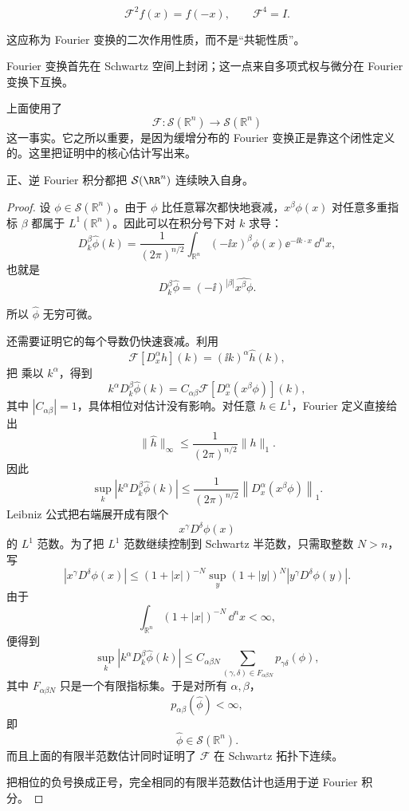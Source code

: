 \[
\mathcal F^2f(x)=f(-x),\qquad \mathcal F^4=I.
\]

这应称为 Fourier 变换的二次作用性质，而不是``共轭性质''。

Fourier 变换首先在 Schwartz 空间上封闭；这一点来自多项式权与微分在 Fourier 变换下互换。

上面使用了
\[
\mathcal F:\mathcal S(\mathbb R^n)\to\mathcal S(\mathbb R^n)
\]
这一事实。它之所以重要，是因为缓增分布的 Fourier 变换正是靠这个闭性定义的。这里把证明中的核心估计写出来。

\begin{proposition}
正、逆 Fourier 积分都把 $\mathcal S(\RR^n)$ 连续映入自身。
\end{proposition}
\begin{proof}
设 $\phi\in\mathcal S(\mathbb R^n)$。由于 $\phi$ 比任意幂次都快地衰减，$x^\beta\phi(x)$ 对任意多重指标 $\beta$ 都属于 $L^1(\mathbb R^n)$。因此可以在积分号下对 $k$ 求导：
\[
D_k^\beta\widehat\phi(k)
=\frac1{(2\pi)^{n/2}}
\int_{\mathbb R^n}(-\ii x)^\beta
\phi(x)\ee^{-\ii k\cdot x}\,\dd^n x,
\]
也就是
\begin{equation}
D_k^\beta\widehat\phi
=(-\ii)^{|\beta|}\widehat{x^\beta\phi}.
\label{eq:schwartz-fourier-derivative}
\end{equation}



所以 $\widehat\phi$ 无穷可微。

还需要证明它的每个导数仍快速衰减。利用
\[
\mathcal F[D_x^\alpha h](k)
=(\ii k)^\alpha\widehat h(k),
\]
把  乘以 $k^\alpha$，得到
\begin{equation*}k^\alpha D_k^\beta\widehat\phi(k)
=C_{\alpha\beta}
\mathcal F\!\left[D_x^\alpha(x^\beta\phi)\right](k),\end{equation*}
其中 $|C_{\alpha\beta}|=1$，具体相位对估计没有影响。对任意 $h\in L^1$，Fourier 定义直接给出
\[
\|\widehat h\|_\infty
\le\frac1{(2\pi)^{n/2}}\|h\|_1.
\]
因此
\[
\sup_k
\left|k^\alpha D_k^\beta\widehat\phi(k)\right|
\le
\frac1{(2\pi)^{n/2}}
\left\|D_x^\alpha(x^\beta\phi)\right\|_1.
\]
Leibniz 公式把右端展开成有限个
\[
x^\gamma D^\delta\phi(x)
\]
的 $L^1$ 范数。为了把 $L^1$ 范数继续控制到 Schwartz 半范数，只需取整数 $N>n$，写
\[
|x^\gamma D^\delta\phi(x)|
\le
(1+|x|)^{-N}
\sup_y(1+|y|)^N|y^\gamma D^\delta\phi(y)|.
\]
由于
\[
\int_{\mathbb R^n}(1+|x|)^{-N}\,\dd^n x<\infty,
\]
便得到
\[
\sup_k
\left|k^\alpha D_k^\beta\widehat\phi(k)\right|
\le C_{\alpha\beta N}
\sum_{(\gamma,\delta)\in F_{\alpha\beta N}}
 p_{\gamma\delta}(\phi),
\]
其中 $F_{\alpha\beta N}$ 只是一个有限指标集。于是对所有 $\alpha,\beta$，
\[
p_{\alpha\beta}(\widehat\phi)<\infty,
\]
即
\begin{equation*}\boxed{\widehat\phi\in\mathcal S(\mathbb R^n).}\end{equation*}
而且上面的有限半范数估计同时证明了 $\mathcal F$ 在 Schwartz 拓扑下连续。

把相位的负号换成正号，完全相同的有限半范数估计也适用于逆 Fourier 积分。
\end{proof}

